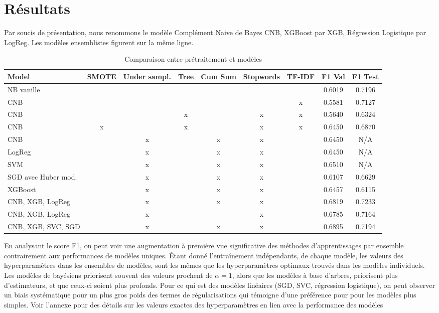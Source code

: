 \documentclass{article}
\begin{document}
\section{Résultats}
Par soucis de présentation, nous renommons le modèle Complément Naive de Bayes CNB, XGBoost par XGB, Régression Logistique par LogReg. Les modèles ensemblistes figurent sur la même ligne.
\begin{table}[H]
    \centering
    \begin{tabular}{|l|c|c|c|c|c|c|c|c|}
        \hline
        \textbf{Model} & \textbf{SMOTE} & \textbf{Under sampl.} & \textbf{Tree} &
        \textbf{Cum Sum} & \textbf{Stopwords} & \textbf{TF-IDF} &
        \textbf{F1 Val} & 
        \textbf{F1 Test} \\
        \hline
        NB vanille &  &  &  &  &  &  & 0.6019 & 0.7196\\
        CNB &  &  &  &  &  & x & 0.5581 & 0.7127\\
        CNB &  &  & x &  & x & x & 0.5640 & 0.6324\\
        CNB & x &  & x &  & x & x & 0.6450 & 0.6870\\
        CNB &  & x &  & x & x &  & 0.6450 & N/A\\
        LogReg &  & x &  & x & x &  & 0.6450 & N/A\\
        SVM &  & x &  & x & x &  & 0.6510 & N/A\\
        SGD avec Huber mod. &  & x &  & x & x &  & 0.6107 & 0.6629\\
        XGBoost &  & x &  & x & x &  & 0.6457 & 0.6115\\
        CNB, XGB, LogReg &  & x &  & x & x &  & 0.6819 & 0.7233\\
        CNB, XGB, LogReg &  & x &  &  & x &  & 0.6785 & 0.7164\\
        CNB, XGB, SVC, SGD &  & x &  & x & x &  & 0.6895 & 0.7194\\
        \hline
    \end{tabular}
    \caption{Comparaison entre prétraitement et modèles}
    \label{tab:model_comparison}
\end{table}
En analysant le score F1, on peut voir une augmentation à première vue significative des méthodes d'apprentissages par ensemble contrairement aux performances de modèles uniques. Étant donné l'entraînement indépendants, de chaque modèle, les valeurs des hyperparamètres dans les ensembles de modèles, sont les mêmes que les hyperparamètres optimaux trouvés dans les modèles individuels. Les modèles de bayésiens priorisent souvent des valeurs prochent de $\alpha = 1$, alors que les modèles à base d'arbres, priorisent plus d'estimateurs, et que ceux-ci soient plus profonds. Pour ce qui est des modèles linéaires (SGD, SVC, régression logistique), on peut observer un biais systématique pour un plus gros poids des termes de régularisations qui témoigne d'une préférence pour pour les modèles plus simples. Voir l'annexe pour des détails sur les valeurs exactes des hyperparamètres en lien avec la performance des modèles
\end{document}
